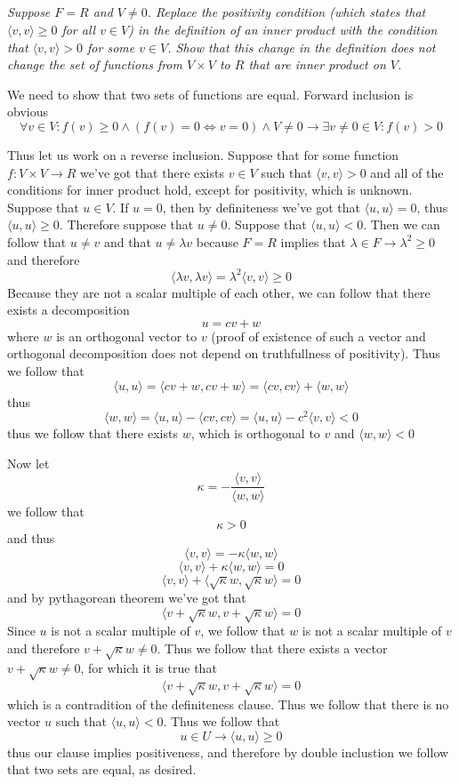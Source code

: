 \documentclass[11pt,oneside,titlepage]{book}
\begin{document}
\subsection{}

\textit{Suppose $F = R$ and $V \neq 0$. Replace the positivity condition (which states that
  $\langle v, v \rangle \geq 0$ for all $v \in V$) in the definition of an inner product with the
  condition that $\langle v, v \rangle > 0$ for some $v \in V$. Show that this change in the
  definition does not change the set of functions from $V \times V$ to $R$ that are inner
  product on $V$.}

We need to show that two sets of functions are equal. Forward inclusion is obvious
$$\forall v \in V: f(v) \geq 0 \land (f(v) = 0 \iff v = 0) \land V \neq 0 \rightarrow
\exists v \neq 0 \in V: f(v) > 0$$

Thus let us work on a reverse inclusion. 
Suppose that for some function $f: V \times V \to R$ we've got that there exists
$v \in V$ such that $\langle v, v \rangle > 0$ and all of the conditions for inner product hold,
except for positivity, which is unknown. Suppose that $u \in V$. If $u = 0$, then by definiteness
we've got that $\langle u, u \rangle = 0$, thus $\langle u, u \rangle \geq 0$.
Therefore suppose that $u \neq 0$. Suppose that $\langle u, u \rangle < 0$.
Then we
can follow that $u \neq v$ and that $u \neq \lambda v$
because $F = R$ implies that $\lambda \in F \to \lambda^2 \geq 0$ and therefore 
$$\langle \lambda v, \lambda v \rangle = \lambda^2 \langle v, v \rangle \geq 0$$
Because they are not a scalar multiple of each other, we can follow that there exists a
decomposition
$$u = cv + w$$
where $w$ is an orthogonal vector to $v$ (proof of existence of such a vector and
orthogonal decomposition does not depend on truthfullness of positivity). Thus we
follow that 
$$\langle u, u \rangle = \langle cv + w, cv + w \rangle =
\langle cv, cv \rangle  +  \langle w, w \rangle$$
thus
$$\langle w, w \rangle = \langle u, u \rangle - \langle cv, cv \rangle =
\langle u, u \rangle - c^2\langle v, v \rangle < 0$$
thus we follow that there exists $w$, which is orthogonal to $v$ and $\langle w, w \rangle < 0$

Now let
$$\kappa = - \frac{\langle v, v \rangle}{ \langle w, w \rangle}$$
we follow that
$$\kappa > 0$$
and thus 
$$\langle v, v \rangle = - \kappa \langle w, w \rangle$$
$$\langle v, v \rangle + \kappa \langle w, w \rangle = 0$$
$$\langle v, v \rangle +  \langle \sqrt{\kappa} w,  \sqrt{\kappa}w \rangle = 0$$
and by pythagorean theorem we've got that 
$$\langle v + \sqrt{\kappa} w, v + \sqrt{\kappa} w \rangle = 0$$
Since $u$ is not a scalar multiple of $v$, we follow that $w$ is not a scalar multiple of
$v$ and therefore $v + \sqrt{\kappa} w \neq 0$. Thus we follow that there exists a
vector $v + \sqrt{\kappa} w \neq 0$, for which it is true that
$$\langle v + \sqrt{\kappa} w, v + \sqrt{\kappa} w \rangle = 0$$
which is a contradition of the definiteness clause. Thus we follow that there is no
vector $u$ such that $\langle u, u \rangle < 0$. Thus we follow that
$$u \in U \to \langle u, u \rangle \geq 0$$
thus our clause implies positiveness, and therefore by double inclustion we follow that
two sets are equal, as desired.
\end{document}
